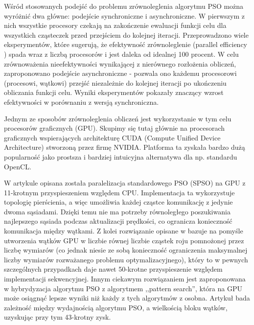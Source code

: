 \documentclass[12pt, twoside, openany, abstract=on]{report}
\theoremstyle{definition}
\begin{document}
Wśród stosowanych podejść do problemu zrównoleglenia algorytmu PSO można wyróżnić dwa główne: podejście synchroniczne i asynchroniczne. W pierwszym z nich wszystkie procesory czekają na zakończenie ewaluacji funkcji celu dla wszystkich cząsteczek przed przejściem do kolejnej iteracji. Przeprowadzono wiele eksperymentów, które sugerują, że efektywność zrównoleglenie (parallel efficiency%
) spada wraz z liczbą procesorów i jest daleka od idealnej 100 procent.
W celu zrównoważenia nieefektywności wynikającej z nierównego rozłożenia obliczeń, zaproponowano podejście asynchroniczne - pozwala ono każdemu procesorowi (procesowi, wątkowi) przejść niezależnie do kolejnej iteracji po ukończeniu obliczania funkcji celu. Wyniki eksperymentów pokazały znaczący wzrost efektywności w porównaniu z wersją synchroniczna. 

Jednym ze sposobów zrównoleglenia obliczeń jest wykorzystanie w tym celu procesorów graficznych (GPU). Skupimy się tutaj głównie na procesorach graficznych wspierających architekturę CUDA (Compute Unified Device Architecture) \cite{CudaProgGuide} stworzoną przez firmę NVIDIA. Platforma ta zyskała bardzo dużą popularność jako prostsza i bardziej intuicyjna alternatywa dla np. standardu OpenCL.


W artykule \cite{GpuBasedPso} opisana została paralelizacja 
 standardowego PSO (SPSO) na GPU z 11-krotnym przyspieszeniem względem CPU. Implementacja ta wykorzystuje topologię pierścienia, a więc umożliwia każdej cząstce komunikację z jedynie dwoma sąsiadami. Dzięki temu nie ma potrzeby równoległego poszukiwania najlepszego sąsiada podczas aktualizacji prędkości, co ogranicza konieczność komunikacja między wątkami. Z kolei rozwiązanie opisane w \cite{PsoCuda} bazuje na pomyśle utworzenia wątków GPU w liczbie równej liczbie cząstek roju pomnożonej przez liczbę wymiarów (co jednak niesie ze sobą konieczność ograniczenia maksymalnej liczby wymiarów rozważanego problemu optymalizacyjnego), który to w pewnych szczególnych przypadkach daje nawet 50-krotne przyspieszenie względem implementacji sekwencyjnej. Innym ciekawym rozwiązaniem jest zaproponowana w \cite{PsoGraphHardLocPat} hybrydyzacja algorytmu PSO z algorytmem ,,pattern search'', która na GPU może osiągnąć lepsze wyniki niż każdy z tych algorytmów z osobna. 
Artykuł \cite{BlockOccupancyGpu} bada zależność między wydajnością algorytmu PSO, a wielkością bloku wątków, uzyskując przy tym 43-krotny zysk.
\end{document}
